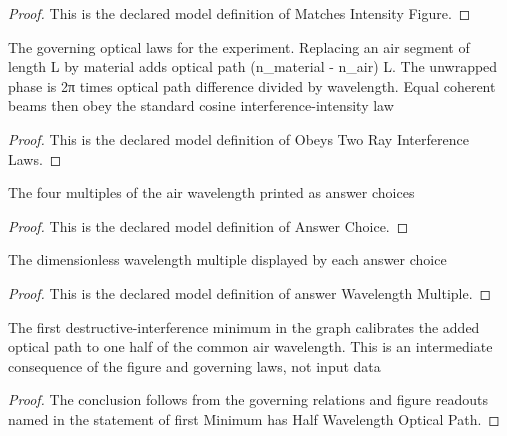 \begin{proof}
  This is the declared model definition of Matches Intensity Figure.
\end{proof}
\begin{definition}
  \label{def:physics:phyx-mini-0088:phyxminiproblems-problemphyxmini0088-obeystworayinterferencelaws}
  The governing optical laws for the experiment. Replacing an air segment of length L by material adds optical path (n\_material - n\_air) L. The unwrapped phase is 2π times optical path difference divided by wavelength. Equal coherent beams then obey the standard cosine interference-intensity law
\end{definition}
\begin{proof}
  This is the declared model definition of Obeys Two Ray Interference Laws.
\end{proof}
\begin{definition}
  \label{def:physics:phyx-mini-0088:phyxminiproblems-problemphyxmini0088-answerchoice}
  The four multiples of the air wavelength printed as answer choices
\end{definition}
\begin{proof}
  This is the declared model definition of Answer Choice.
\end{proof}
\begin{definition}
  \label{def:physics:phyx-mini-0088:phyxminiproblems-problemphyxmini0088-answerwavelengthmultiple}
  The dimensionless wavelength multiple displayed by each answer choice
\end{definition}
\begin{proof}
  This is the declared model definition of answer Wavelength Multiple.
\end{proof}
\begin{lemma}
  \label{lem:physics:phyx-mini-0088:phyxminiproblems-problemphyxmini0088-firstminimum-hashalfwavelengthopticalpath}
  The first destructive-interference minimum in the graph calibrates the added optical path to one half of the common air wavelength. This is an intermediate consequence of the figure and governing laws, not input data
\end{lemma}
\begin{proof}
  The conclusion follows from the governing relations and figure readouts named in the statement of first Minimum has Half Wavelength Optical Path.
\end{proof}
